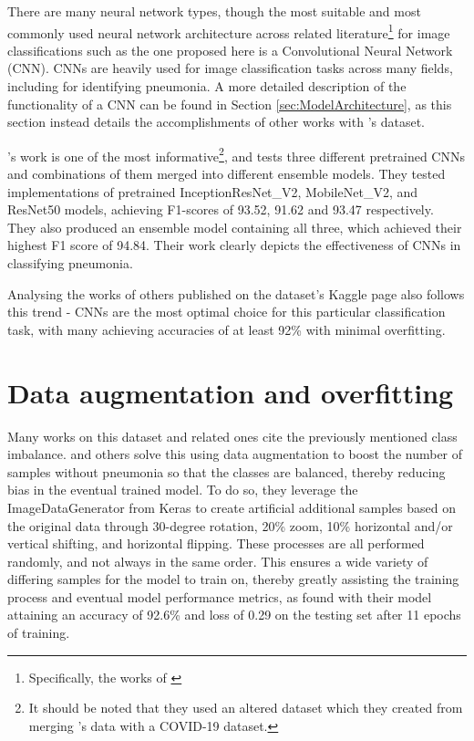 \documentclass[12pt]{report}
\newcommand{\para}{\vspace{7pt}\noindent}
\begin{document}
\para There are many neural network 
types, though the most suitable and most commonly used neural network architecture across related literature\footnote{Specifically, the works of \textcite{elasnaouiDesignEnsembleDeep2021a,rajpurkarCheXNetRadiologistLevelPneumonia2017,sourabComparisonHybridDeep2022,stephenEfficientDeepLearning2019,umaribrahimConvolutionalNeuralNetwork2022b}} 
for image classifications such as the one proposed here is a Convolutional Neural Network (CNN).
CNNs are heavily used for image classification tasks across many fields, including for identifying pneumonia. A more detailed 
description of the functionality of a CNN can be found in Section \ref{sec:ModelArchitecture}, as this section instead details 
the accomplishments of other works with \textcite{kermanyIdentifyingMedicalDiagnoses2018}'s dataset.

\para \textcite{elasnaouiDesignEnsembleDeep2021a}'s work is one of the most informative\footnote{It should be noted that they used an altered dataset which they created from merging \textcite{kermanyIdentifyingMedicalDiagnoses2018}'s data with a COVID-19 dataset.},
and tests three different pretrained CNNs and combinations of them merged into different ensemble models. 
They tested implementations of pretrained InceptionResNet\_V2, MobileNet\_V2, and ResNet50 models, achieving F1-scores of 93.52, 91.62 and 93.47 
respectively. They also produced an ensemble model containing all three, which achieved their highest F1 score of 94.84. Their work clearly 
depicts the effectiveness of CNNs in classifying pneumonia.

\para Analysing the works of others published on the dataset's Kaggle page also follows this trend - CNNs are the most optimal choice for this 
particular classification task, with many achieving accuracies of at least 92\% with minimal overfitting. 

\newpage

\section{Data augmentation and overfitting}\label{sec:Augmentation}
Many works on this dataset and related ones cite the previously mentioned class imbalance.
\textcite{mathurPneumoniaDetectionUsing2020} and others solve this using data augmentation to boost the number of samples without 
pneumonia so that the classes are balanced, thereby reducing bias in the eventual trained model.
To do so, they leverage the ImageDataGenerator from Keras to create artificial additional samples based on the original data through 
30-degree rotation, 20\% zoom, 10\% horizontal and/or vertical shifting, and horizontal flipping. These processes are all performed randomly,
and not always in the same order. This ensures a wide variety of differing samples for the model to train on, thereby greatly assisting 
the training process and eventual model performance metrics, as \textcite{mathurPneumoniaDetectionUsing2020} found with their model attaining 
an accuracy of 92.6\% and loss of 0.29 on the testing set after 11 epochs of training.
\end{document}
